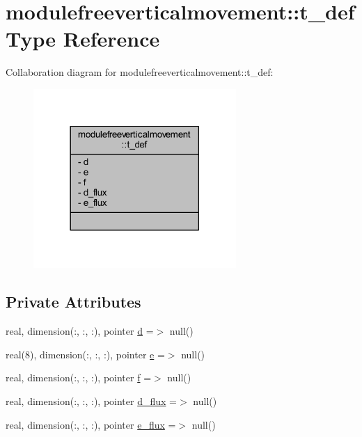 \hypertarget{structmodulefreeverticalmovement_1_1t__def}{}\section{modulefreeverticalmovement\+:\+:t\+\_\+def Type Reference}
\label{structmodulefreeverticalmovement_1_1t__def}


Collaboration diagram for modulefreeverticalmovement\+:\+:t\+\_\+def\+:\nopagebreak
\begin{figure}[H]
\begin{center}
\leavevmode
\includegraphics[width=218pt]{structmodulefreeverticalmovement_1_1t__def__coll__graph}
\end{center}
\end{figure}
\subsection*{Private Attributes}
\begin{DoxyCompactItemize}
\item 
real, dimension(\+:, \+:, \+:), pointer \mbox{\hyperlink{structmodulefreeverticalmovement_1_1t__def_a6441fdaef581634e05b9df2f34247661}{d}} =$>$ null()
\item 
real(8), dimension(\+:, \+:, \+:), pointer \mbox{\hyperlink{structmodulefreeverticalmovement_1_1t__def_a630236dfedfce687f5bb8c8ea7f38533}{e}} =$>$ null()
\item 
real, dimension(\+:, \+:, \+:), pointer \mbox{\hyperlink{structmodulefreeverticalmovement_1_1t__def_a1e7bd38a371eab6c682770edd0fc3df5}{f}} =$>$ null()
\item 
real, dimension(\+:, \+:, \+:), pointer \mbox{\hyperlink{structmodulefreeverticalmovement_1_1t__def_a5a7eb002c6f888cb7434706e17793887}{d\+\_\+flux}} =$>$ null()
\item 
real, dimension(\+:, \+:, \+:), pointer \mbox{\hyperlink{structmodulefreeverticalmovement_1_1t__def_aca56818c05cc4e68136a177a9d9a4e6c}{e\+\_\+flux}} =$>$ null()
\end{DoxyCompactItemize}


